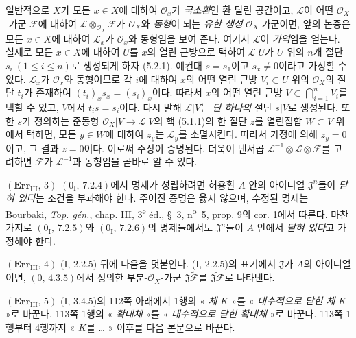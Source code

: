 일반적으로 $X$가 모든
$x\in X$에 대하여 $\mathscr O_x$가 \emph{국소환}인 환 달린 공간이고,
$\mathscr L$이 어떤 $\mathscr O_X$-가군 $\mathscr F$에 대하여
$\mathscr L\otimes_{\mathscr O_X}\mathscr F$가
$\mathscr O_X$와 \emph{동형}이 되는 \emph{유한 생성}
$\mathscr O_X$-가군이면, 앞의 논증은 모든 $x\in X$에 대하여
$\mathscr L_x$가 $\mathscr O_x$와 동형임을 보여 준다. 여기서
$\mathscr L$이 \emph{가역}임을 얻는다. 실제로 모든 $x\in X$에 대하여
$U$를 $x$의 열린 근방으로 택하여 $\mathscr L|U$가 $U$ 위의
$n$개 절단 $s_i\ (1\leq i\leq n)$로 생성되게 하자 (5.2.1). 예컨대
$s=s_1$이고 $s_x\ne0$이라고 가정할 수 있다. $\mathscr L_x$가
$\mathscr O_x$와 동형이므로 각 $i$에 대하여 $x$의 어떤 열린 근방
$V_i\subset U$ 위의 $\mathscr O_X$의 절단 $t_i$가 존재하여
$(t_i)_x s_x=(s_i)_x$이다. 따라서 $x$의 어떤 열린 근방
$V\subset\bigcap_{i=1}^nV_i$를 택할 수 있고, $V$에서
$t_i s=s_i$이다. 다시 말해
$\mathscr L|V$는 \emph{단 하나의} 절단 $s|V$로 생성된다. 또한
$s$가 정의하는 준동형 $\mathscr O_X|V\to\mathscr L|V$의 핵 (5.1.1)의
한 절단 $z$를 열린집합 $W\subset V$ 위에서 택하면, 모든 $y\in W$에
대하여 $z_y$는 $\mathscr L_y$를 소멸시킨다. 따라서 가정에 의해
$z_y=0$이고, 그 결과 $z=0$이다. 이로써 주장이 증명된다. 더욱이
텐서곱 $\mathscr L^{-1}\otimes\mathscr L\otimes\mathscr F$를
고려하면 $\mathscr F$가 $\mathscr L^{-1}$과 동형임을 곧바로 알 수 있다.

\noindent\textbf{$(\mathbf{Err}_{\mathrm{III}},\,3)$}
$(0_{\mathrm I},\,7.2.4)$에서 명제가 성립하려면 허용환 $A$ 안의
아이디얼 $\mathfrak J^n$들이 \emph{닫혀 있다}는 조건을 부과해야 한다.
주어진 증명은 옳지 않으며, 수정된 명제는 Bourbaki, \emph{Top. gén.},
chap. III, 3\textsuperscript{e} éd., \S~3, n\textsuperscript{o}~5,
prop. 9의 cor. 1에서 따른다. 마찬가지로 $(0_{\mathrm I},\,7.2.5)$와
$(0_{\mathrm I},\,7.2.6)$의 명제들에서도 $\mathfrak J^n$들이 $A$ 안에서
\emph{닫혀 있다}고 가정해야 한다.

\noindent\textbf{$(\mathbf{Err}_{\mathrm{III}},\,4)$}
(I, 2.2.5) 뒤에 다음을 덧붙인다. (I, 2.2.5)의 표기에서
$\mathfrak J$가 $A$의 아이디얼이면, $(0,\,4.3.5)$에서 정의한
부분-$\mathscr O_X$-가군 $\mathfrak J\widetilde{\mathscr F}$를
$\widetilde{\mathfrak J\mathscr F}$로 나타낸다.

\noindent\textbf{$(\mathbf{Err}_{\mathrm{III}},\,5)$}
(I, 3.4.5)의 112쪽 아래에서 1행의 « \emph{체} $K$ »를
« \emph{대수적으로 닫힌 체} $K$ »로 바꾼다. 113쪽 1행의
« \emph{확대체} »를 « \emph{대수적으로 닫힌 확대체} »로 바꾼다.
113쪽 1행부터 4행까지 « $K$를 \ldots{} » 이후를 다음 본문으로 바꾼다.

